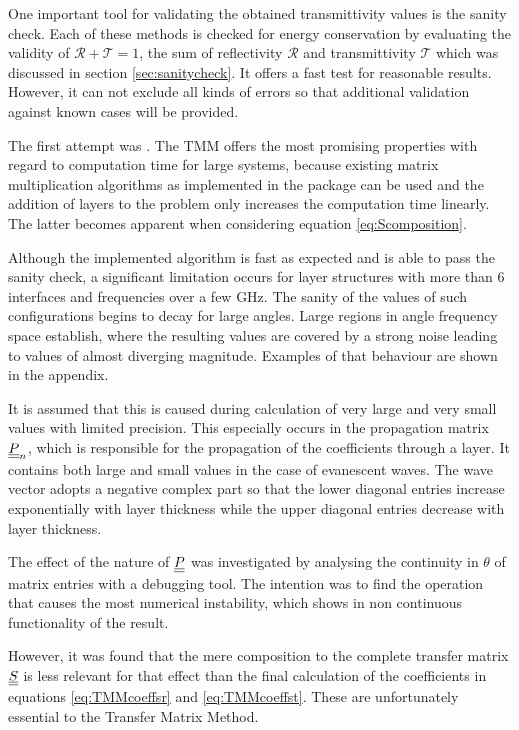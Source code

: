 One important tool for validating the obtained transmittivity values is the
sanity check. Each of these methods is checked for energy conservation by
evaluating the
validity of $\mathcal{R}+\mathcal{T}=1$, the sum of reflectivity $\mathcal{R}$
and transmittivity $\mathcal{T}$ which was discussed in section
\ref{sec:sanitycheck}. It offers a fast test for reasonable
results. However, it can not exclude all kinds of errors so that additional
validation against known cases will be provided.

The first attempt was . The TMM offers the most promising
properties with regard to computation time for large systems, because existing
matrix multiplication algorithms as implemented in the  package can
be used and the addition of layers to the problem only increases the
computation time linearly. The latter becomes apparent when considering
equation \ref{eq:Scomposition}.

Although the implemented algorithm is fast as expected and is able to pass the
sanity check, a significant limitation occurs for layer structures with more
than 6 interfaces and frequencies over a few GHz. The sanity of the values of
such configurations begins to decay for large angles. Large regions in angle
frequency space establish, where the resulting values are covered by a strong
noise leading to values of almost diverging magnitude. Examples of that
behaviour are shown in the appendix.

It is assumed that this is caused during calculation of very large and very
small values with limited precision. 
This especially occurs in the propagation matrix $\underline{\underline{P}}_n$, which is
responsible for the propagation of the coefficients through a layer. It
contains
both large and small
values in the case of evanescent waves. The wave vector adopts
a negative complex part so that the lower diagonal entries increase
exponentially with layer thickness while the upper diagonal entries decrease
with layer thickness.

The effect of the nature of $\underline{\underline{P}}$ was investigated by analysing
the continuity in $\theta$ of matrix entries with a debugging tool. The
intention was to find the operation that causes the most numerical instability,
which shows in non continuous functionality of the result.

However, it was found that the mere composition to the complete transfer
matrix $\underline{\underline{S}}$ is less relevant for that effect than the final calculation
of the coefficients in equations \ref{eq:TMMcoeffsr} and \ref{eq:TMMcoeffst}.
These are unfortunately essential to the Transfer Matrix Method.

